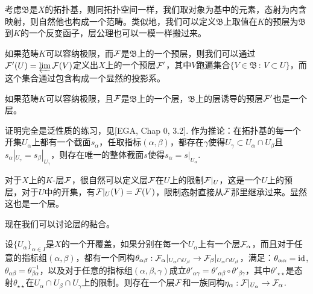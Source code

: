 

\begin{para}
考虑$\mathfrak{B}$是$X$的拓扑基，则同拓扑空间一样，我们取对象为基中的元素，态射为内含映射，则自然他也构成一个范畴。类似地，我们可以定义$\mathfrak{B}$上取值在$K$的预层为$\mathfrak{B}$到$K$的一个反变函子，层公理也可以一模一样搬过来。

如果范畴$K$可以容纳极限，而$\mathcal{F}$是$\mathfrak{B}$上的一个预层，则我们可以通过$\mathcal{F}'(U)=\varprojlim \mathcal{F}(V)$定义出$X$上的一个预层$\mathcal{F}'$，其中$V$跑遍集合$\{V\in \mathfrak{B}\,:\, V\subset U\}$，而这个集合通过包含构成一个显然的投影系。
\end{para}

\begin{pro}\label{psgl}
如果范畴$K$可以容纳极限，且$\mathcal{F}$是$\mathfrak{B}$上的一个层，$\mathfrak{B}$上的层诱导的预层$\mathcal{F}'$也是一个层。
\end{pro}

证明完全是泛性质的练习，见[EGA, Chap 0, 3.2]. 作为推论：在拓扑基的每一个开集$U_\alpha$上都有一个截面$s_\alpha$，任取指标$(\alpha,\beta)$，都存在$\gamma$使得$U_\gamma\subset U_\alpha\cap U_\beta$且$s_\alpha|_{U_\gamma}=s_\beta|_{U_\gamma}$，则存在唯一的整体截面$s$使得$s_\alpha=s|_{U_\alpha}$.

\begin{para}[层的限制]
对于$X$上的$K$-层$\mathcal{F}$，很自然可以定义层$\mathcal{F}$在$U$上的限制$\mathcal{F}|_U$，这是一个$U$上的预层，对于$U$中的开集，有$\mathcal{F}|_U(V)=\mathcal{F}(V)$，限制态射直接从$\mathcal{F}$那里继承过来。显然这也是一个层。
\end{para}

现在我们可以讨论层的黏合。

\begin{pro}
设$\{U_\alpha\}_{\alpha \in I}$是$X$的一个开覆盖，如果分别在每一个$U_\alpha$上有一个层$\mathcal{F}_\alpha$，而且对于任意的指标组$(\alpha,\beta)$，都有一个同构$\theta_{\alpha\beta}:\mathcal{F}_\alpha|_{U_\alpha\cap U_\beta}\to \mathcal{F}_\beta|_{U_\alpha\cap U_\beta}$，满足：$\theta_{\alpha\alpha}=\operatorname{id}$, $\theta_{\alpha\beta}=\theta_{\beta\alpha}^{-1}$，以及对于任意的指标组$(\alpha,\beta,\gamma)$成立$\theta'_{\alpha\gamma}=\theta'_{\alpha\beta}\circ \theta'_{\beta\gamma}$，其中$\theta'_{\star\star}$是态射$\theta_{\star\star}$在$U_\alpha\cap U_\beta \cap U_\gamma$上的限制。则存在一个层$\mathcal{F}$和一族同构$\eta_\alpha:\mathcal{F}|_{U_\alpha}\to \mathcal{F}_\alpha$.
\end{pro}


